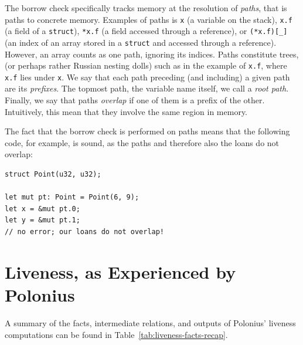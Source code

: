 \documentclass[11pt,a4paper,twoside,openany]{report}
\newcommand{\InRust}[1]{\texttt{#1}}
\begin{document}
The borrow check specifically tracks memory at the resolution of \textit{paths},
that is paths to concrete memory. Examples of paths is \InRust{x} (a variable on
the stack), \InRust{x.f} (a field of a \InRust{struct}), \InRust{*x.f} (a field
accessed through a reference), or \InRust{(*x.f)[_]} (an index of an array
stored in a \InRust{struct} and accessed through a reference). However, an array
counts as one path, ignoring its indices. Paths constitute trees, (or perhaps
rather Russian nesting dolls) such as in the example of \InRust{x.f}, where
\InRust{x.f} lies under \InRust{x}. We say that each path preceding (and
including) a given path are its \textit{prefixes}. The topmost path, the
variable name itself, we call a \textit{root path}. Finally, we say that paths
\textit{overlap} if one of them is a prefix of the other. Intuitively, this mean
that they involve the same region in memory.


The fact that the borrow check is performed on paths means that the following
code, for example, is sound, as the paths and therefore also the loans do not
overlap:
\begin{verbatim}
struct Point(u32, u32);

let mut pt: Point = Point(6, 9);
let x = &mut pt.0;
let y = &mut pt.1;
// no error; our loans do not overlap!
\end{verbatim}

\section{Liveness, as Experienced by Polonius}\label{sec:liveness}

A summary of the facts, intermediate relations, and outputs of Polonius'
liveness computations can be found in Table~\ref{tab:liveness-facts-recap}.
\end{document}
